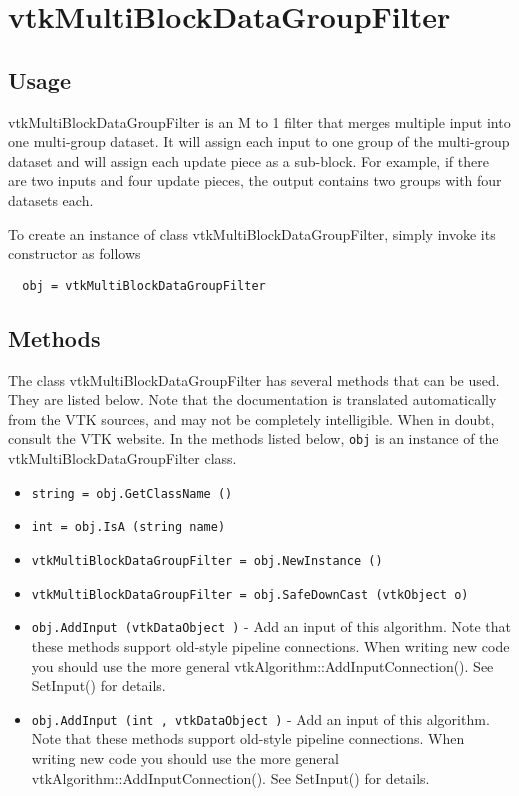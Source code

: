 \section{vtkMultiBlockDataGroupFilter}

\subsection{Usage}

 vtkMultiBlockDataGroupFilter is an M to 1 filter that merges multiple
 input into one multi-group dataset. It will assign each input to
 one group of the multi-group dataset and will assign each update piece
 as a sub-block. For example, if there are two inputs and four update
 pieces, the output contains two groups with four datasets each.

To create an instance of class vtkMultiBlockDataGroupFilter, simply
invoke its constructor as follows
\begin{verbatim}
  obj = vtkMultiBlockDataGroupFilter
\end{verbatim}
\subsection{Methods}

The class vtkMultiBlockDataGroupFilter has several methods that can be used.
  They are listed below.
Note that the documentation is translated automatically from the VTK sources,
and may not be completely intelligible.  When in doubt, consult the VTK website.
In the methods listed below, \verb|obj| is an instance of the vtkMultiBlockDataGroupFilter class.
\begin{itemize}
\item  \verb|string = obj.GetClassName ()|

\item  \verb|int = obj.IsA (string name)|

\item  \verb|vtkMultiBlockDataGroupFilter = obj.NewInstance ()|

\item  \verb|vtkMultiBlockDataGroupFilter = obj.SafeDownCast (vtkObject o)|

\item  \verb|obj.AddInput (vtkDataObject )| -  Add an input of this algorithm.  Note that these methods support
 old-style pipeline connections.  When writing new code you should
 use the more general vtkAlgorithm::AddInputConnection().  See
 SetInput() for details.

\item  \verb|obj.AddInput (int , vtkDataObject )| -  Add an input of this algorithm.  Note that these methods support
 old-style pipeline connections.  When writing new code you should
 use the more general vtkAlgorithm::AddInputConnection().  See
 SetInput() for details.

\end{itemize}
